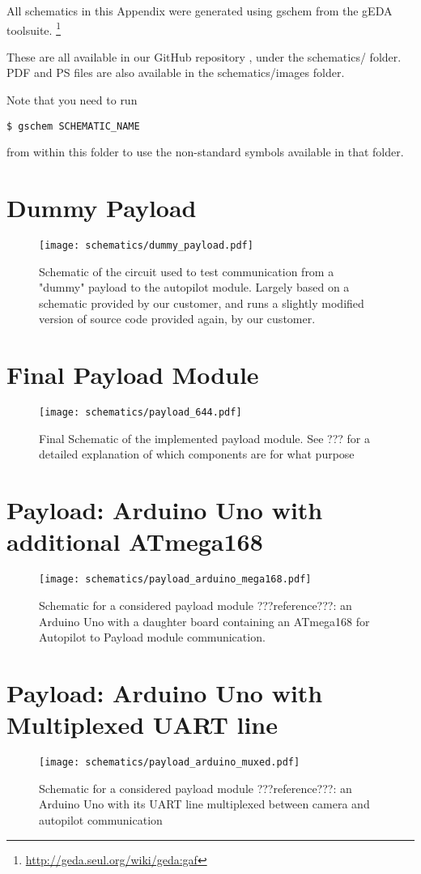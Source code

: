 \label{appendix_schematics}

All schematics in this Appendix were generated using gschem from the gEDA 
toolsuite. \footnote{\url{http://geda.seul.org/wiki/geda:gaf}}

These are all available in our GitHub repository \cite{github}, under the 
schematics/ folder. PDF and PS files are also available in the 
schematics/images folder.

Note that you need to run 
\begin{verbatim} 
$ gschem SCHEMATIC_NAME
\end{verbatim}
from within this folder to use the non-standard symbols available in that 
folder.

\section{Dummy Payload}
\begin{figure}[H]
\texttt{[image: schematics/dummy\_payload.pdf]}
\caption{Schematic of the circuit used to test communication from a "dummy" 
payload to the autopilot module. Largely based on a schematic provided by 
our customer, and runs a slightly modified version of source code provided 
again, by our customer.}
\end{figure}

\section{Final Payload Module}
\label{Payload_Schematic}
\begin{figure}[H]
\texttt{[image: schematics/payload\_644.pdf]}
\caption{Final Schematic of the implemented payload module. See ??? for a 
detailed explanation of which components are for what purpose}
\end{figure}

\section{Payload: Arduino Uno with additional ATmega168}
\begin{figure}[H]
\texttt{[image: schematics/payload\_arduino\_mega168.pdf]}
\caption{Schematic for a considered payload module ???reference???: an 
Arduino Uno with a daughter board containing an ATmega168 for Autopilot to 
Payload module communication.}
\end{figure}

\section{Payload: Arduino Uno with Multiplexed UART line}
\begin{figure}[H]
\texttt{[image: schematics/payload\_arduino\_muxed.pdf]}
\caption{Schematic for a considered payload module ???reference???: an 
Arduino Uno with its UART line multiplexed between camera and autopilot 
communication}
\end{figure}
